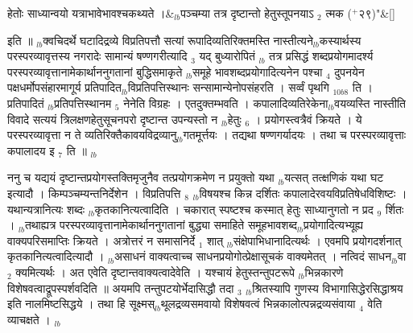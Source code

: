 \documentclass[article,12pt,a4paper]{memoir}%
\newcommand{\add}[1]{($^{+}$#1)}
\newcounter{parCount}
\begin{document}
	    
	    \stanza[\smallbreak]
	  हेतोः साध्यान्वयो यत्राभावेभावश्चकथ्यते ।&{\tiny $_{lb}$}पञ्चम्या तत्र दृष्टान्तो हेतुस्तूपनयाऽ {\tiny $_{2}$} त्मक \add{२९}{\normalfontlatin\large\qquad{}"}\&[\smallbreak]
	  
	  
	  
	    \pstart  \leavevmode%
	    \hphantom{.}
	   इति ॥ {\tiny $_{lb}$}क्वचिदर्थे घटादिद्रव्ये विप्रतिपत्तौ सत्यां रूपादिव्यतिरिक्तमस्ति नास्तीत्यने{\tiny $_{lb}$}कस्यार्थस्य परस्परव्यावृत्तस्य नगरादेः सामान्यं षण्णगरीत्यादि {\tiny $_{3}$} यद् बुध्यारोपितं {\tiny $_{lb}$} \leavevmode{} तत्र प्रसिद्धं शब्दप्रयोगमादर्श्य परस्परव्यावृत्तानामेकार्थाननुगतानां बुद्धिसमाकृते {\tiny $_{lb}$}समूहे भावशब्दप्रयोगादित्यनेन पश्चा {\tiny $_{4}$} दुपनयेन पक्षधर्मोपसंहारमागूर्य प्रतिपादित{\tiny $_{lb}$}विप्रतिपत्तिस्थानः सन्सामान्येनोपसंहरति । {\color{DodgerBlue3}सर्व्वं पृथगि {\tiny $_{10b8}$} ति} । प्रतिपादितं {\tiny $_{lb}$}प्रतिपत्तिस्थानम {\tiny $_{5}$} नेनेति विग्रहः । एतदुक्तम्भवति । कपालादिव्यतिरेकेना{\tiny $_{lb}$}वयव्यस्ति नास्तीति विवादे सत्ययं त्रिलक्षणहेतुसूचनपरो दृष्टान्त उपन्यस्तो न {\tiny $_{lb}$}हेतुः {\tiny $_{6}$} । प्रयोगस्त्वत्रैवं क्रियते । ये परस्परव्यावृत्ता न ते व्यतिरिक्तैकावयविद्रव्यानु{\tiny $_{lb}$}गतमूर्त्तयः । तद्यथा षण्णगर्यादयः । तथा च परस्परव्यावृत्ताः कपालादय इ {\tiny $_{7}$} ति ॥
	{}
	\pend%
      {\tiny $_{lb}$}

	  
	  \pstart \leavevmode%
	ननु च यद्ययं दृष्टान्तप्रयोगस्तक्तिमृजुनैव तत्प्रयोगक्रमेण न प्रयुक्तो यथा {\tiny $_{lb}$}यत्सत् तत्क्षणिकं यथा घट इत्यादौ । किम्पञ्चम्यन्तनिर्देशेन । विप्रतिपत्ति {\tiny $_{8}$} {\tiny $_{lb}$}विषयश्च किन्न दर्शितः कपालादेरवयविप्रतिषेधविशिष्टः । यथान्यत्रानित्यः शब्दः {\tiny $_{lb}$}कृतकानित्यत्वादिति । चकारात् स्पष्टश्च कस्मात् हेतुः साध्यानुगतो न प्रद {\tiny $_{9}$} \leavevmode{} र्शितः । {\tiny $_{lb}$}तथाह्यत्र परस्परव्यावृत्तानामेकार्थाननुगतानां बुद्ध्या समाहिते समूहभावशब्द{\tiny $_{lb}$}प्रयोगादित्यभ्यूह्य वाक्यपरिसमाप्तिः क्रियते । अत्रोत्तरं न समासनिर्दे {\tiny $_{1}$} शात् {\tiny $_{lb}$}संक्षेपाभिधानादित्यर्थः । एवमपि प्रयोगदर्शनात् कृतकानित्यत्वादित्यादौ । {\tiny $_{lb}$}असाधनं वाक्यत्वाच्च साधनप्रयोगोत्प्रेक्षासूचकं वाक्यमेतत् । नत्विदं साधन{\tiny $_{lb}$}वा {\tiny $_{2}$} क्यमित्यर्थः । अत एवेति दृष्टान्तवाक्यत्वादेवेति । यश्चायं हेतुस्तन्तुपटरूपे {\tiny $_{lb}$}भिन्नकारणे विशेषवत्वाद्रूपस्पर्शवदिति ॥ अयमपि तन्तुपटयोर्भेदासिद्धौ तदा {\tiny $_{3}$} {\tiny $_{lb}$}श्रितस्यापि गुणस्य विभागासिद्धेरसिद्धाश्रय इति नालमिष्टसिद्धये । तथा हि सूक्ष्मस्{\tiny $_{lb}$}थूलद्रव्यसमवायो विशेषवत्वं भिन्नकालोत्पन्नद्रव्यसंवाया {\tiny $_{4}$} वेति व्याचक्षते ।
	{}
	\pend%
      {\tiny $_{lb}$}
\end{document}

